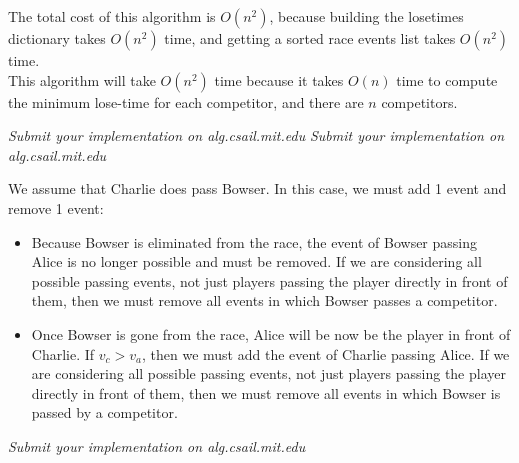 \documentclass[12pt,twoside]{article}
\begin{document}
\begin{problems}
\begin{problemparts}
The total cost of this algorithm is $O(n^2)$, because building the losetimes dictionary takes $O(n^2)$ time, and getting a sorted race events list takes $O(n^2)$ time. \\

\smallskip
This algorithm will take $O(n^2)$ time because it takes $O(n)$ time to compute the minimum lose-time for each competitor, and there are $n$ competitors. 


\problempart \emph{Submit your implementation on alg.csail.mit.edu}
\problempart \emph{Submit your implementation on alg.csail.mit.edu}


\problempart We assume that Charlie does pass Bowser. In this case, we must add 1 event and remove 1 event:
\begin{itemize}

\item Because Bowser is eliminated from the race, the event of Bowser passing Alice is no longer possible and must be removed. If we are considering all possible passing events, not just players passing the player directly in front of them, then we must remove all events in which Bowser passes a competitor. 

\item Once Bowser is gone from the race, Alice will be now be the player in front of Charlie. If $v_c > v_a$, then we must add the event of Charlie passing Alice. If we are considering all possible passing events, not just players passing the player directly in front of them, then we must remove all events in which Bowser is passed by a competitor. 

\end{itemize}



\problempart \emph{Submit your implementation on alg.csail.mit.edu}
\end{problemparts}

\end{problems}
\end{document}

